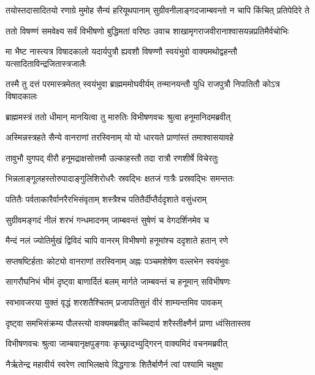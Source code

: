 
\twolineshloka
{तयोस्तदासादितयो रणाग्रे मुमोह सैन्यं हरियूथपानाम्}
{सुग्रीवनीलाङ्गदजाम्बवन्तो न चापि किंचित् प्रतिपेदिरे ते} %

\twolineshloka
{ततो विषण्णं समवेक्ष्य सर्वं विभीषणो बुद्धिमतां वरिष्ठः}
{उवाच शाखामृगराजवीरानाश्वासयन्नप्रतिमैर्वचोभिः} %

\twolineshloka
{मा भैष्ट नास्त्यत्र विषादकालो यदार्यपुत्रौ ह्यवशौ विषण्णौ}
{स्वयंभुवो वाक्यमथोद्वहन्तौ यत्सादिताविन्द्रजितास्त्रजालैः} %

\twolineshloka
{तस्मै तु दत्तं परमास्त्रमेतत् स्वयंभुवा ब्राह्मममोघवीर्यम्}
{तन्मानयन्तौ युधि राजपुत्रौ निपातितौ कोऽत्र विषादकालः} %

\twolineshloka
{ब्राह्ममस्त्रं ततो धीमान् मानयित्वा तु मारुतिः}
{विभीषणवचः श्रुत्वा हनूमानिदमब्रवीत्} %

\twolineshloka
{अस्मिन्नस्त्रहते सैन्ये वानराणां तरस्विनाम्}
{यो यो धारयते प्राणांस्तं तमाश्वासयावहे} %

\twolineshloka
{तावुभौ युगपद् वीरौ हनूमद्राक्षसोत्तमौ}
{उल्काहस्तौ तदा रात्रौ रणशीर्षे विचेरतुः} %

\twolineshloka
{भिन्नलाङ्गूलहस्तोरुपादाङ्गुलिशिरोधरैः}
{स्रवद्भिः क्षतजं गात्रैः प्रस्रवद्भिः समन्ततः} %

\twolineshloka
{पतितैः पर्वताकारैर्वानरैरभिसंवृताम्}
{शस्त्रैश्च पतितैर्दीप्तैर्ददृशाते वसुंधराम्} %

\twolineshloka
{सुग्रीवमङ्गदं नीलं शरभं गन्धमादनम्}
{जाम्बवन्तं सुषेणं च वेगदर्शिनमेव च} %

\twolineshloka
{मैन्दं नलं ज्योतिर्मुखं द्विविदं चापि वानरम्}
{विभीषणो हनूमांश्च ददृशाते हतान् रणे} %

\twolineshloka
{सप्तषष्टिर्हताः कोट्यो वानराणां तरस्विनाम्}
{अह्नः पञ्चमशेषेण वल्लभेन स्वयंभुवः} %

\twolineshloka
{सागरौघनिभं भीमं दृष्ट्वा बाणार्दितं बलम्}
{मार्गते जाम्बवन्तं च हनूमान् सविभीषणः} %

\twolineshloka
{स्वभावजरया युक्तं वृद्धं शरशतैश्चितम्}
{प्रजापतिसुतं वीरं शाम्यन्तमिव पावकम्} %

\twolineshloka
{दृष्ट्वा समभिसंक्रम्य पौलस्त्यो वाक्यमब्रवीत्}
{कच्चिदार्य शरैस्तीक्ष्णैर्न प्राणा ध्वंसितास्तव} %

\twolineshloka
{विभीषणवचः श्रुत्वा जाम्बवानृक्षपुङ्गवः}
{कृच्छ्रादभ्युद्गिरन् वाक्यमिदं वचनमब्रवीत्} %

\twolineshloka
{नैर्ऋतेन्द्र महावीर्य स्वरेण त्वाभिलक्षये}
{विद्धगात्रः शितैर्बाणैर्न त्वां पश्यामि चक्षुषा} %

